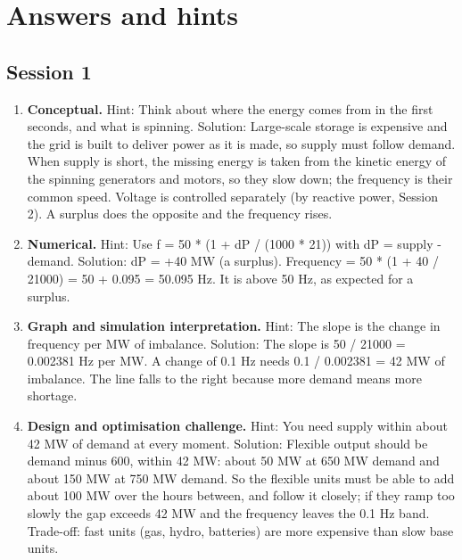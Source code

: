 \documentclass[11pt,a4paper]{article}
\begin{document}
\section{Answers and hints}

\subsection*{Session 1}
\begin{enumerate}[nosep]
\item \textbf{Conceptual.} Hint: Think about where the energy comes from in the first seconds, and what is spinning. Solution: Large-scale storage is expensive and the grid is built to deliver power as it is made, so supply must follow demand. When supply is short, the missing energy is taken from the kinetic energy of the spinning generators and motors, so they slow down; the frequency is their common speed. Voltage is controlled separately (by reactive power, Session 2). A surplus does the opposite and the frequency rises.
\item \textbf{Numerical.} Hint: Use f = 50 * (1 + dP / (1000 * 21)) with dP = supply - demand. Solution: dP = +40 MW (a surplus). Frequency = 50 * (1 + 40 / 21000) = 50 + 0.095 = 50.095 Hz. It is above 50 Hz, as expected for a surplus.
\item \textbf{Graph and simulation interpretation.} Hint: The slope is the change in frequency per MW of imbalance. Solution: The slope is 50 / 21000 = 0.002381 Hz per MW. A change of 0.1 Hz needs 0.1 / 0.002381 = 42 MW of imbalance. The line falls to the right because more demand means more shortage.
\item \textbf{Design and optimisation challenge.} Hint: You need supply within about 42 MW of demand at every moment. Solution: Flexible output should be demand minus 600, within 42 MW: about 50 MW at 650 MW demand and about 150 MW at 750 MW demand. So the flexible units must be able to add about 100 MW over the hours between, and follow it closely; if they ramp too slowly the gap exceeds 42 MW and the frequency leaves the 0.1 Hz band. Trade-off: fast units (gas, hydro, batteries) are more expensive than slow base units.
\end{enumerate}
\end{document}
